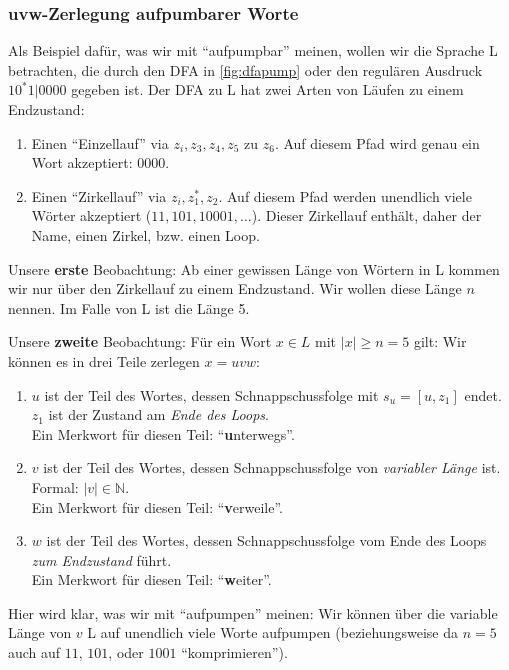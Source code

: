 \subsubsection{uvw-Zerlegung aufpumbarer Worte}
Als Beispiel dafür, was wir mit ``aufpumpbar'' meinen,
wollen wir die Sprache L betrachten, die durch den DFA in \autoref{fig:dfapump}
oder den regulären Ausdruck $10^*1|0000$ gegeben ist.
Der DFA zu L hat zwei Arten von Läufen zu einem Endzustand:
\begin{enumerate}
    \item Einen ``Einzellauf'' via $z_i, z_3, z_4, z_5$ zu $z_6$.
        Auf diesem Pfad wird genau ein Wort akzeptiert: $0000$.
    \item Einen ``Zirkellauf'' via $z_i, z_1^*, z_2$.
        Auf diesem Pfad werden unendlich viele Wörter akzeptiert ($11, 101, 10001, \ldots$).
        Dieser Zirkellauf enthält, daher der Name, einen Zirkel, bzw. einen Loop.
\end{enumerate}

Unsere \textbf{erste} Beobachtung:
Ab einer gewissen Länge von Wörtern in L kommen wir nur über den Zirkellauf zu einem
Endzustand.
Wir wollen diese Länge $n$ nennen. Im Falle von L ist die Länge 5.

Unsere \textbf{zweite} Beobachtung:
Für ein Wort $x \in L$ mit $|x| \geq n = 5$ gilt: Wir können es in drei Teile zerlegen
$x = uvw$:
\begin{enumerate}
    \item $u$ ist der Teil des Wortes,
        dessen Schnappschussfolge mit $s_u = [u,z_1]$ endet.
        $z_1$ ist der Zustand am \emph{Ende des Loops}.\\
        Ein Merkwort für diesen Teil: ``\textbf{u}nterwegs''.
    \item $v$ ist der Teil des Wortes,
        dessen Schnappschussfolge von \emph{variabler Länge} ist.
        Formal: $|v| \in \mathbb{N}$.\\
        Ein Merkwort für diesen Teil: ``\textbf{v}erweile''.
    \item $w$ ist der Teil des Wortes,
        dessen Schnappschussfolge vom Ende des Loops \emph{zum Endzustand} führt.\\
        Ein Merkwort für diesen Teil: ``\textbf{w}eiter''.
\end{enumerate}
Hier wird klar, was wir mit ``aufpumpen'' meinen:
Wir können über die variable Länge von $v$ L auf unendlich viele Worte aufpumpen
(beziehungsweise da $n = 5$ auch auf $11$, $101$, oder $1001$ ``komprimieren'').

